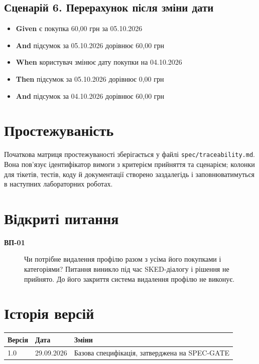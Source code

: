 \documentclass[12pt,a4paper]{article}
\newcommand{\req}[2]{\item[\textbf{#1}] #2}
\begin{document}
\subsection*{Сценарій 6. Перерахунок після зміни дати}
\begin{itemize}
  \item \textbf{Given} є покупка 60,00 грн за 05.10.2026
  \item \textbf{And} підсумок за 05.10.2026 дорівнює 60,00 грн
  \item \textbf{When} користувач змінює дату покупки на 04.10.2026
  \item \textbf{Then} підсумок за 05.10.2026 дорівнює 0,00 грн
  \item \textbf{And} підсумок за 04.10.2026 дорівнює 60,00 грн
\end{itemize}

\section{Простежуваність}
Початкова матриця простежуваності зберігається у файлі \texttt{spec/traceability.md}.
Вона пов'язує ідентифікатор вимоги з критерієм прийняття та сценарієм; колонки для тікетів,
тестів, коду й документації створено заздалегідь і заповнюватимуться в наступних лабораторних роботах.

\section{Відкриті питання}
\begin{description}
\req{ВП-01}{Чи потрібне видалення профілю разом з усіма його покупками і категоріями? Питання виникло під час SKED-діалогу і рішення не прийнято. До його закриття система видалення профілю не виконує.}
\end{description}

\section{Історія версій}
\begin{tabular}{@{}lll@{}}
\toprule
Версія & Дата & Зміни \\
\midrule
1.0 & 29.09.2026 & Базова специфікація, затверджена на SPEC-GATE \\
\bottomrule
\end{tabular}
\end{document}
